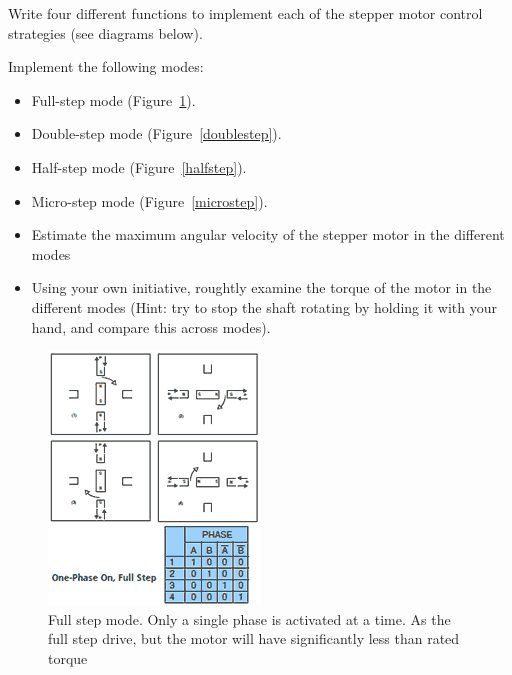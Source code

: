 \documentclass{instructions}
\begin{document}
  Write four different functions to implement each of the stepper
  motor control strategies (see diagrams below).

  Implement the following modes:

  \begin{itemize}
  \item Full-step mode (Figure~\ref{fullstep}).
  \item Double-step mode (Figure~\ref{doublestep}).
  \item Half-step mode (Figure~\ref{halfstep}).
  \item Micro-step mode (Figure~\ref{microstep}).
  \end{itemize}


\begin{itemize}
    \item Estimate the maximum angular velocity of the stepper motor in the different modes

   \item Using your own initiative, roughtly examine the torque of the motor in
        the different modes (Hint: try to stop the shaft rotating by holding
        it with your hand, and compare this across modes).

\end{itemize}


\begin{figure}[h!]
    \centering
    \includegraphics[width=0.4\linewidth]{figs/fullstep.png}
    \caption{Full step mode. Only a single phase is activated at a time.
  As the full step drive, but the motor will have significantly less
    than rated torque}
    \label{fullstep}
\end{figure}
\end{document}
